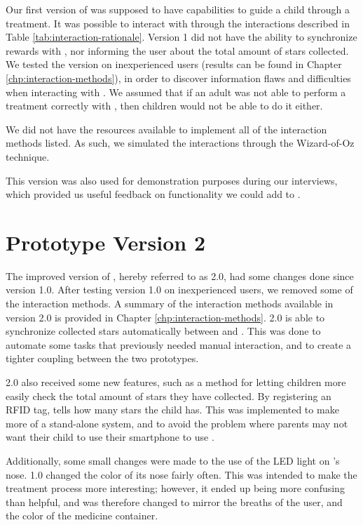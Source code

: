 Our first version of \ab{} was supposed to have capabilities to guide a child through a treatment. It was possible to interact with \ab{} through the interactions described in Table \ref{tab:interaction-rationale}. Version 1 did not have the ability to synchronize rewards with \app{}, nor informing the user about the total amount of stars collected. We tested the version on inexperienced users (results can be found in Chapter \ref{chp:interaction-methods}), in order to discover information flaws and difficulties when interacting with \ab{}. We assumed that if an adult was not able to perform a treatment correctly with \ab{}, then children would not be able to do it either.  

We did not have the resources available to implement all of the interaction methods listed. As such, we simulated the interactions through the Wizard-of-Oz technique\cite{wilson1988rapid}.

This version was also used for demonstration purposes during our interviews, which provided us useful feedback on functionality we could add to \ab{}.           
	
\section{Prototype Version 2}
\label{sec:abversion2}
The improved version of \ab{}, hereby referred to as \ab{} 2.0, had some changes done since version 1.0. After testing version 1.0 on inexperienced users, we removed some of the interaction methods. A summary of the interaction methods available in version 2.0 is provided in Chapter \ref{chp:interaction-methods}. \ab{} 2.0 is able to synchronize collected stars automatically between \app{} and \ab{}. This was done to automate some tasks that previously needed manual interaction, and to create a tighter coupling between the two prototypes.

\ab{} 2.0 also received some new features, such as a method for letting children more easily check the total amount of stars they have collected. By registering an RFID tag, \ab{} tells how many stars the child has. This was implemented to make \ab{} more of a stand-alone system, and to avoid the problem where parents may not want their child to use their smartphone to use \app{}. 
 
Additionally, some small changes were made to the use of the LED light on \ab{}'s nose. \ab{} 1.0 changed the color of its nose fairly often. This was intended to make the treatment process more interesting; however, it ended up being more confusing than helpful, and was therefore changed to mirror the breaths of the user, and the color of the medicine container. 

